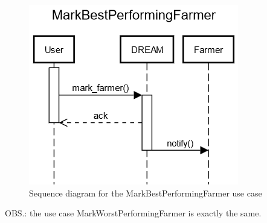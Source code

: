 \documentclass{article}
\begin{document}
\begin{figure}[H]
    \centering
	\includegraphics[scale=0.5]{sequence_diagrams/MarkBestPerformingFarmer.png}
    \caption{Sequence diagram for the MarkBestPerformingFarmer use case}
\end{figure}
OBS.: the use case MarkWorstPerformingFarmer is exactly the same.
\newpage

\end{document}
